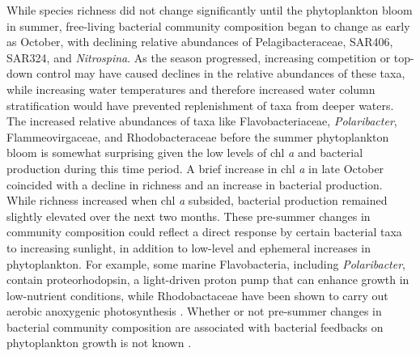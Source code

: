 While species richness did not change significantly until the phytoplankton bloom in summer, free-living bacterial community composition began to change as early as October, with declining relative abundances of Pelagibacteraceae, SAR406, SAR324, and \textit{Nitrospina}. As the season progressed, increasing competition or top-down control may have caused declines in the relative abundances of these taxa, while increasing water temperatures and therefore increased water column stratification would have prevented replenishment of taxa from deeper waters. The increased relative abundances of taxa like Flavobacteriaceae, \textit{Polaribacter}, Flammeovirgaceae, and Rhodobacteraceae before the summer phytoplankton bloom is somewhat surprising given the low levels of chl \textit{a} and bacterial production during this time period. A brief increase in chl \textit{a} in late October coincided with a decline in richness and an increase in bacterial production. While richness increased when chl \textit{a} subsided, bacterial production remained slightly elevated over the next two months. These pre-summer changes in community composition could reflect a direct response by certain bacterial taxa to increasing sunlight, in addition to low-level and ephemeral increases in phytoplankton. For example, some marine Flavobacteria, including \textit{Polaribacter}, contain proteorhodopsin, a light-driven proton pump that can enhance growth in low-nutrient conditions, while Rhodobactaceae have been shown to carry out aerobic anoxygenic photosynthesis \citep{gonzalez2008genome,Kimura2011-eh,Xing2015-kz,Voget2015-ch}. Whether or not pre-summer changes in bacterial community composition are associated with bacterial feedbacks on phytoplankton growth is not known \citep{Amin2012-tv,Amin2015-pp,Prieto2015-oi,Wang2016-lt}. 

